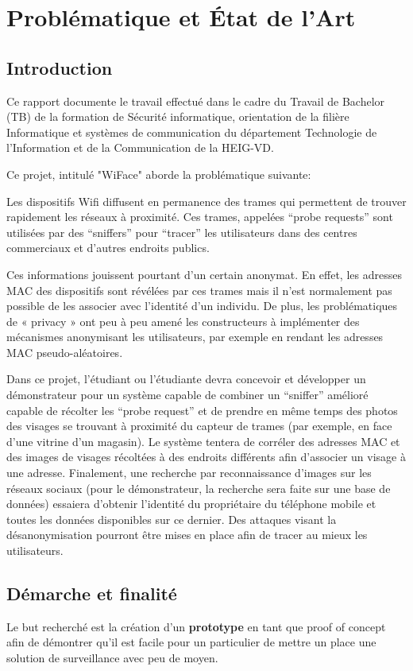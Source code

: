 \chapter{Problématique et État de l'Art}
\label{ch:problematic}

\section{Introduction}
Ce rapport documente le travail effectué dans le cadre du Travail de Bachelor (TB) de la formation de Sécurité informatique, orientation de la filière Informatique 
et systèmes de communication du département Technologie de l'Information et de la Communication de la HEIG-VD.

Ce projet, intitulé "WiFace" aborde la problématique suivante:

Les dispositifs Wifi diffusent en permanence des trames qui permettent de trouver rapidement les réseaux à
proximité. Ces trames, appelées “probe requests” sont utilisées par des “sniffers” pour “tracer” les utilisateurs dans
des centres commerciaux et d'autres endroits publics.

Ces informations jouissent pourtant d'un certain anonymat. En effet, les adresses MAC des dispositifs sont révélées
par ces trames mais il n'est normalement pas possible de les associer avec l'identité d'un individu. De plus, les
problématiques de « privacy » ont peu à peu amené les constructeurs à implémenter des mécanismes anonymisant
les utilisateurs, par exemple en rendant les adresses MAC pseudo-aléatoires.

Dans ce projet, l'étudiant ou l'étudiante devra concevoir et développer un démonstrateur pour un système capable
de combiner un “sniffer” amélioré capable de récolter les “probe request” et de prendre en même temps des
photos des visages se trouvant à proximité du capteur de trames (par exemple, en face d'une vitrine d'un magasin).
Le système tentera de corréler des adresses MAC et des images de visages récoltées à des endroits différents afin
d'associer un visage à une adresse. Finalement, une recherche par reconnaissance d'images sur les réseaux sociaux
(pour le démonstrateur, la recherche sera faite sur une base de données) essaiera d'obtenir l'identité du
propriétaire du téléphone mobile et toutes les données disponibles sur ce dernier. Des attaques visant la
désanonymisation pourront être mises en place afin de tracer au mieux les utilisateurs.

\section{Démarche et finalité}
Le but recherché est la création d'un \textbf{prototype} en tant que proof of concept afin de démontrer qu'il est facile pour un particulier de mettre un place
une solution de surveillance avec peu de moyen. 

